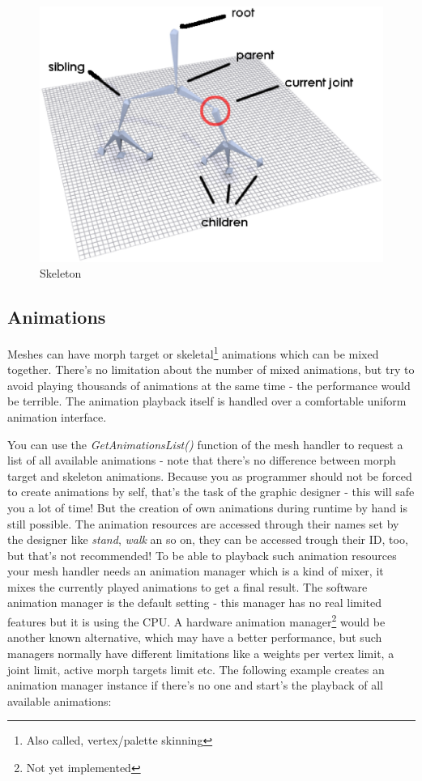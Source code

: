 \begin{figure}
	\centering
	\includegraphics[scale=0.5]{pics/Skeleton.eps}
	\caption{Skeleton}
	\label{fig:Skeleton}
\end{figure}




\subsection{Animations}
Meshes can have morph target or skeletal\footnote{Also called, vertex/palette skinning} animations which can be mixed together. There's no limitation about the number of mixed animations, but try to avoid playing thousands of animations at the same time - the performance would be terrible. The animation playback itself is handled over a comfortable uniform animation interface.

You can use the \emph{GetAnimationsList()} function of the mesh handler to request a list of all available animations - note that there's no difference between morph target and skeleton animations. Because you as programmer should not be forced to create animations by self, that's the task of the graphic designer - this will safe you a lot of time! But the creation of own animations during runtime by hand is still possible. The animation resources are accessed through their names set by the designer like \emph{stand}, \emph{walk} an so on, they can be accessed trough their ID, too, but that's not recommended! To be able to playback such animation resources your mesh handler needs an animation manager which is a kind of mixer, it mixes the currently played animations to get a final result. The software animation manager is the default setting - this manager has no real limited features but it is using the \ac{CPU}. A hardware animation manager\footnote{Not yet implemented} would be another known alternative, which may have a better performance, but such managers normally have different limitations like a weights per vertex limit, a joint limit, active morph targets limit etc. The following example creates an animation manager instance if there's no one and start's the playback of all available animations:

